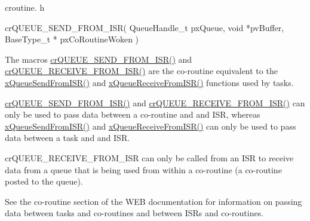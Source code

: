 croutine. h 
\begin{DoxyPre}
 crQUEUE\_SEND\_FROM\_ISR(
                           QueueHandle\_t pxQueue,
                           void *pvBuffer,
                           BaseType\_t * pxCoRoutineWoken
                      )\end{DoxyPre}


The macro\textquotesingle{}s \hyperlink{vendor_2ceedling_2plugins_2freertos_2src_2freertos_2include_2croutine_8h_ac8eb0a81c5cf69de7e4edd73ce44a3be}{cr\+Q\+U\+E\+U\+E\+\_\+\+S\+E\+N\+D\+\_\+\+F\+R\+O\+M\+\_\+\+I\+S\+R()} and \hyperlink{vendor_2ceedling_2plugins_2freertos_2src_2freertos_2include_2croutine_8h_a9c0fa977ca69adbddb4811affa2a71f7}{cr\+Q\+U\+E\+U\+E\+\_\+\+R\+E\+C\+E\+I\+V\+E\+\_\+\+F\+R\+O\+M\+\_\+\+I\+S\+R()} are the co-\/routine equivalent to the \hyperlink{externals_2freertos_2include_2queue_8h_a21d5919ed26c21d121df4a4debeb643c}{x\+Queue\+Send\+From\+I\+S\+R()} and \hyperlink{externals_2freertos_2include_2queue_8h_acdf528f5c91131ae2f31c669cfd65758}{x\+Queue\+Receive\+From\+I\+S\+R()} functions used by tasks.

\hyperlink{vendor_2ceedling_2plugins_2freertos_2src_2freertos_2include_2croutine_8h_ac8eb0a81c5cf69de7e4edd73ce44a3be}{cr\+Q\+U\+E\+U\+E\+\_\+\+S\+E\+N\+D\+\_\+\+F\+R\+O\+M\+\_\+\+I\+S\+R()} and \hyperlink{vendor_2ceedling_2plugins_2freertos_2src_2freertos_2include_2croutine_8h_a9c0fa977ca69adbddb4811affa2a71f7}{cr\+Q\+U\+E\+U\+E\+\_\+\+R\+E\+C\+E\+I\+V\+E\+\_\+\+F\+R\+O\+M\+\_\+\+I\+S\+R()} can only be used to pass data between a co-\/routine and and I\+SR, whereas \hyperlink{externals_2freertos_2include_2queue_8h_a21d5919ed26c21d121df4a4debeb643c}{x\+Queue\+Send\+From\+I\+S\+R()} and \hyperlink{externals_2freertos_2include_2queue_8h_acdf528f5c91131ae2f31c669cfd65758}{x\+Queue\+Receive\+From\+I\+S\+R()} can only be used to pass data between a task and and I\+SR.

cr\+Q\+U\+E\+U\+E\+\_\+\+R\+E\+C\+E\+I\+V\+E\+\_\+\+F\+R\+O\+M\+\_\+\+I\+SR can only be called from an I\+SR to receive data from a queue that is being used from within a co-\/routine (a co-\/routine posted to the queue).

See the co-\/routine section of the W\+EB documentation for information on passing data between tasks and co-\/routines and between I\+SR\textquotesingle{}s and co-\/routines.


